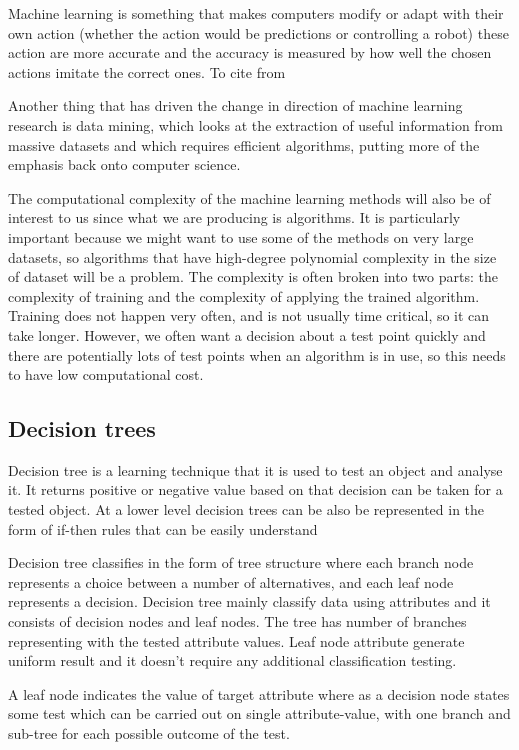 \documentclass{article}
\begin{document}
Machine learning is something that makes computers modify or adapt with their own action (whether the action would be predictions or controlling a robot) these action are more accurate and the accuracy is measured by how well the chosen actions imitate the correct ones. To cite from \cite{MachineLearningAnAlgorithmicPerspective}

Another thing that has driven the change in direction of machine learning research is data mining, which looks at the extraction of useful information from massive datasets and which requires efficient algorithms, putting more of the emphasis back onto computer science. 

The computational complexity of the machine learning methods will also be of interest to us since what we are producing is algorithms. It is particularly important because we might want to use some of the methods on very large datasets, so algorithms that have high-degree polynomial complexity in the size of dataset will be a problem. The complexity is often broken into two parts: the complexity of training and the complexity of applying the trained algorithm.
Training does not happen very often, and is not usually time critical, so it can take longer. However, we often want a decision about a test point quickly and there are potentially lots of test points when an algorithm is in use, so this needs to have low computational cost.

\subsection{Decision trees}
\label{sec:dectree}


Decision tree is a learning technique that it is used to test an object and analyse it. It returns positive or negative value based on that decision can be taken for a tested object. At a lower level decision trees can be also be represented in the form of if-then rules that can be easily understand

Decision tree classifies in the form of tree structure where each branch node represents a choice between a number of alternatives, and each leaf node represents a decision. Decision tree mainly classify data using attributes and it consists of decision nodes and leaf nodes. The tree has number of branches representing with the tested attribute values. Leaf node attribute generate uniform result and it doesn't require any additional classification testing.	

A leaf node indicates the value of target attribute where as a decision node states some test which can be carried out on single attribute-value, with one branch and sub-tree for each possible outcome of the test.
\end{document}
